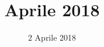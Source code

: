 


\title{ Aprile 2018}
\author{\GroupName}

\date{2 Aprile 2018}



\frenchspacing

\makeFrontPage




